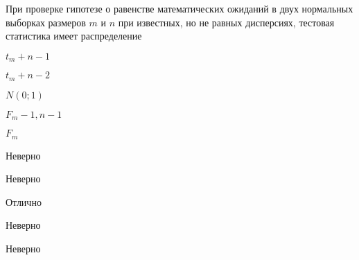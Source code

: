 
\begin{question}
При проверке гипотезе о равенстве математических ожиданий в двух
нормальных выборках размеров \(m\) и \(n\) при известных, но не равных
дисперсиях, тестовая статистика имеет распределение
\begin{answerlist}
  \item \(t_m+n-1\)
  \item \(t_m+n-2\)
  \item \(N(0;1)\)
  \item \(F_m-1,n-1\)
  \item \(F_m\)
\end{answerlist}
\end{question}

\begin{solution}
\begin{answerlist}
  \item Неверно
  \item Неверно
  \item Отлично
  \item Неверно
  \item Неверно
\end{answerlist}
\end{solution}

